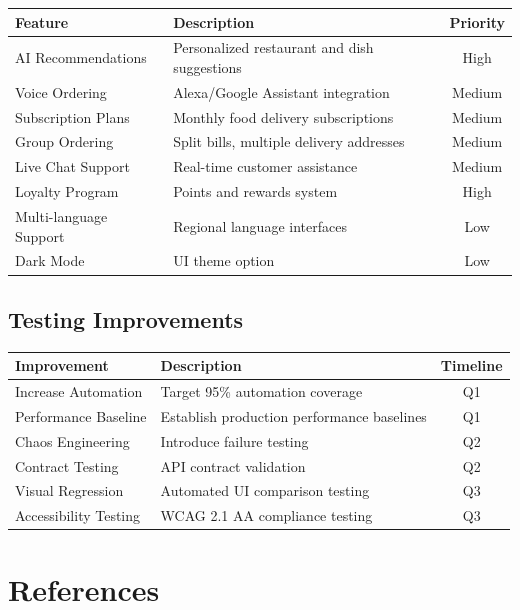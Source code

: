 \documentclass[12pt,a4paper]{report}
\begin{document}
\begin{longtable}{|p{4cm}|p{6cm}|c|}
\hline
\textbf{Feature} & \textbf{Description} & \textbf{Priority} \\
\hline
\endfirsthead
AI Recommendations & Personalized restaurant and dish suggestions & High \\
\hline
Voice Ordering & Alexa/Google Assistant integration & Medium \\
\hline
Subscription Plans & Monthly food delivery subscriptions & Medium \\
\hline
Group Ordering & Split bills, multiple delivery addresses & Medium \\
\hline
Live Chat Support & Real-time customer assistance & Medium \\
\hline
Loyalty Program & Points and rewards system & High \\
\hline
Multi-language Support & Regional language interfaces & Low \\
\hline
Dark Mode & UI theme option & Low \\
\hline
\end{longtable}

\section{Testing Improvements}

\begin{longtable}{|p{3.5cm}|p{6cm}|c|}
\hline
\textbf{Improvement} & \textbf{Description} & \textbf{Timeline} \\
\hline
\endfirsthead
Increase Automation & Target 95\% automation coverage & Q1 \\
\hline
Performance Baseline & Establish production performance baselines & Q1 \\
\hline
Chaos Engineering & Introduce failure testing & Q2 \\
\hline
Contract Testing & API contract validation & Q2 \\
\hline
Visual Regression & Automated UI comparison testing & Q3 \\
\hline
Accessibility Testing & WCAG 2.1 AA compliance testing & Q3 \\
\hline
\end{longtable}

\chapter{References}
\end{document}
